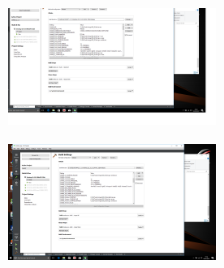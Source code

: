 \documentclass[a4paper,10pt]{article}
\begin{document}
\begin{minipage}{0.5\linewidth}
\begin{figure}[H]
\begin{center}
\includegraphics[width=5.5cm]{fig7.png}
\vspace*{-1mm}
\caption{\small  \label{fig:7}}
\end{center}
\end{figure}
\end{minipage}
\begin{minipage}{0.5\linewidth}
\begin{figure}[H]
\begin{center}
\includegraphics[width=5.5cm]{fig8.png}
\vspace*{-1mm}
\caption{\small  \label{fig:8}}
\end{center}
\end{figure}
\end{minipage}
\end{document}
